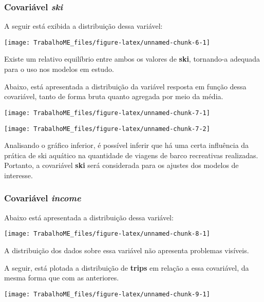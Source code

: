 \documentclass[
  twocolumn]{article}
\begin{document}
\subsubsection{\texorpdfstring{Covariável
\emph{ski}}{Covariável ski}}\label{covariuxe1vel-ski}

A seguir está exibida a distribuição dessa variável:

\begin{center}\texttt{[image: TrabalhoME\_files/figure-latex/unnamed-chunk-6-1]} \end{center}

Existe um relativo equilíbrio entre ambos os valores de \textbf{ski},
tornando-a adequada para o uso nos modelos em estudo.

Abaixo, está apresentada a distribuição da variável resposta em função
dessa covariável, tanto de forma bruta quanto agregada por meio da
média.

\begin{center}\texttt{[image: TrabalhoME\_files/figure-latex/unnamed-chunk-7-1]} \end{center}

\begin{center}\texttt{[image: TrabalhoME\_files/figure-latex/unnamed-chunk-7-2]} \end{center}

Analisando o gráfico inferior, é possível inferir que há uma certa
influência da prática de ski aquático na quantidade de viagens de barco
recreativas realizadas. Portanto, a covariável \textbf{ski} será
considerada para os ajustes dos modelos de interesse.

\subsubsection{\texorpdfstring{Covariável
\emph{income}}{Covariável income}}\label{covariuxe1vel-income}

Abaixo está apresentada a distribuição dessa variável:

\begin{center}\texttt{[image: TrabalhoME\_files/figure-latex/unnamed-chunk-8-1]} \end{center}

A distribuição dos dados sobre essa variável não apresenta problemas
visíveis.

A seguir, está plotada a distribuição de \textbf{trips} em relação a
essa covariável, da mesma forma que com as anteriores.

\begin{center}\texttt{[image: TrabalhoME\_files/figure-latex/unnamed-chunk-9-1]} \end{center}
\end{document}
